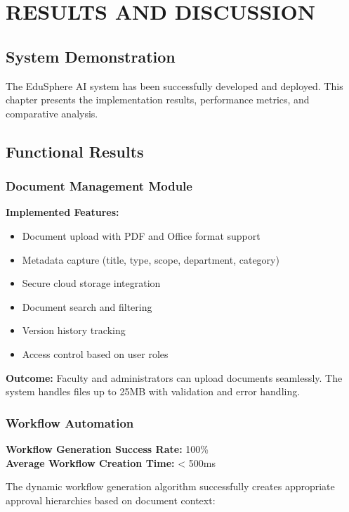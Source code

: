 \chapter{RESULTS AND DISCUSSION}

\section{System Demonstration}

The EduSphere AI system has been successfully developed and deployed. This chapter presents the implementation results, performance metrics, and comparative analysis.

\section{Functional Results}

\subsection{Document Management Module}

\textbf{Implemented Features:}
\begin{itemize}
\item Document upload with PDF and Office format support
\item Metadata capture (title, type, scope, department, category)
\item Secure cloud storage integration
\item Document search and filtering
\item Version history tracking
\item Access control based on user roles
\end{itemize}

\textbf{Outcome:} Faculty and administrators can upload documents seamlessly. The system handles files up to 25MB with validation and error handling.

\subsection{Workflow Automation}

\textbf{Workflow Generation Success Rate:} 100\%\\
\textbf{Average Workflow Creation Time:} < 500ms

The dynamic workflow generation algorithm successfully creates appropriate approval hierarchies based on document context:


